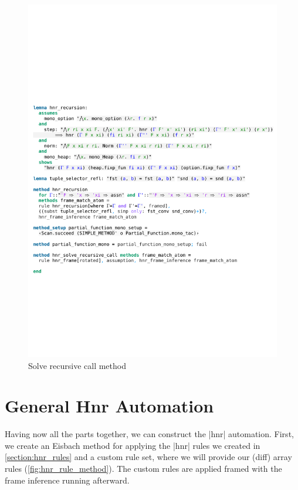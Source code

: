 \begin{figure}[htpb]
    \includegraphics[trim={0 7,8cm 0 20,8cm}, clip, width=1.00\textwidth]{figures/Theory_Hnr_Recursion.pdf}
    \caption[Solve recursive call method]{Solve recursive call method}
    \label{fig:hnr_solve_recursion}
\end{figure}


\section{General Hnr Automation}\label{section:general_hnr}

Having now all the parts together, we can construct the |hnr| automation. First, we create an Eisbach method for applying the |hnr| rules we created in \autoref{section:hnr_rules} and a custom rule set, where we will provide our (diff) array rules (\autoref{fig:hnr_rule_method}). The custom rules are applied framed with the frame inference running afterward.

